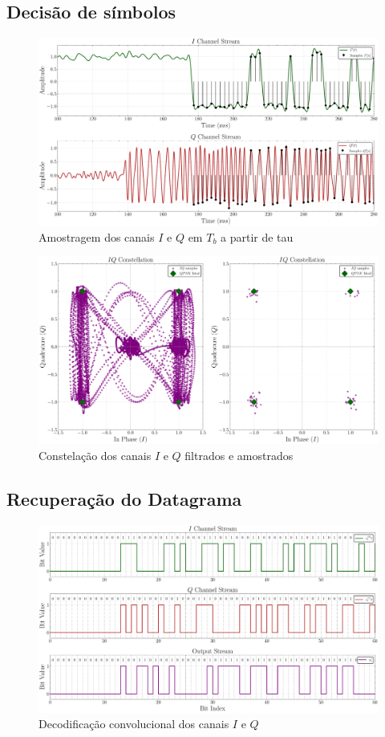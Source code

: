 \subsection{Decisão de símbolos}\label{sec:decisao_simbolos}

\begin{figure}[H]
	\centering
	\caption{Amostragem dos canais $I$ e $Q$ em $T_b$ a partir de \gls{tau}}\label{fig:receiver_sampler}
	\includegraphics[width=\linewidth]{assets/cap3/receiver_sampler_time.pdf}
\end{figure}

\begin{figure}[H]
	\centering
	\caption{Constelação dos canais $I$ e $Q$ filtrados e amostrados}\label{fig:receiver_const}
	\includegraphics[width=\linewidth]{assets/cap3/receiver_sampler_const.pdf}
\end{figure}

\subsection{Recuperação do Datagrama}\label{sec:decodificacao_convolucional}

\begin{figure}[H]
	\centering
	\caption{Decodificação convolucional dos canais $I$ e $Q$}\label{fig:receiver_conv}
	\includegraphics[width=\linewidth]{assets/cap3/receiver_conv_time.pdf}
\end{figure}